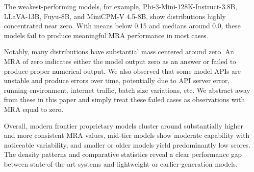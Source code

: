 The weakest-performing models, for example, Phi-3-Mini-128K-Instruct-3.8B, LLaVA-13B, Fuyu-8B, and MiniCPM-V 4.5-8B, show distributions highly concentrated near zero. With means below 0.15 and medians around 0.0, these models fail to produce meaningful MRA performance in most cases.

Notably, many distributions have substantial mass centered around zero. An MRA of zero indicates either the model output zero as an answer or failed to produce proper numerical output. We also observed that some model APIs are unstable and produce errors over time, potentially due to API server error, running environment, internet traffic, batch size variations, etc. We abstract away from these in this paper and simply treat these failed cases as observations with MRA equal to zero.

Overall, modern frontier proprietary models cluster around substantially higher and more consistent MRA values, mid-tier models show moderate capability with noticeable variability, and smaller or older models yield predominantly low scores. The density patterns and comparative statistics reveal a clear performance gap between state-of-the-art systems and lightweight or earlier-generation models.